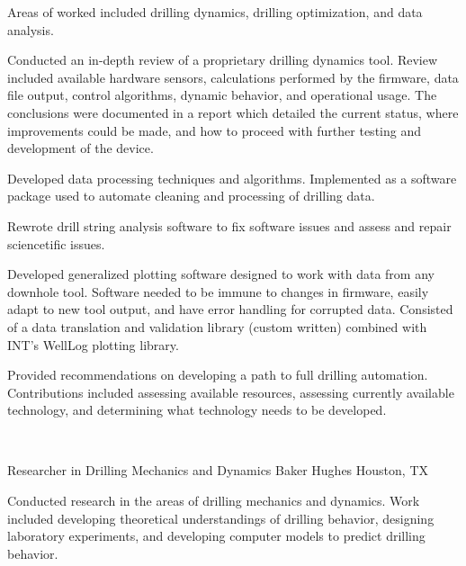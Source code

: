 \documentclass{resume}
\begin{document}
					\noindent Areas of worked included drilling dynamics, drilling optimization, and data analysis.
		\begin{bulletedlist}
			
		\item 
					Conducted an in-depth review of a proprietary drilling dynamics tool.  Review included available hardware sensors, calculations performed by the firmware, data file output, control algorithms, dynamic behavior, and operational usage.  The conclusions were documented in a report which detailed the current status, where improvements could be made, and how to proceed with further testing and development of the device.
				
		\item 
					Developed data processing techniques and algorithms.  Implemented as a software package used to automate cleaning and processing of drilling data.
				
		\item 
					Rewrote drill string analysis software to fix software issues and assess and repair sciencetific issues.
				
		\item 
					Developed generalized plotting software designed to work with data from any downhole tool.  Software needed to be immune to changes in firmware, easily adapt to new tool output, and have error handling for corrupted data.  Consisted of a data translation and validation library (custom written) combined with INT's WellLog plotting library.
				
		\item 
					Provided recommendations on developing a path to full drilling automation.  Contributions included assessing available resources, assessing currently available technology, and determining what technology needs to be developed.
				
		\end{bulletedlist}
			\vspace*{-12pt}
	\hspace*{0pt}\\ \vspace*{-2pt}
				
            {Researcher in Drilling Mechanics and Dynamics}
            {Baker Hughes}
			{Houston, TX}
			
					\noindent 
				Conducted research in the areas of drilling mechanics and dynamics.  Work included developing theoretical understandings of drilling behavior, designing laboratory experiments, and developing computer models to predict drilling behavior.
			
\end{document}
